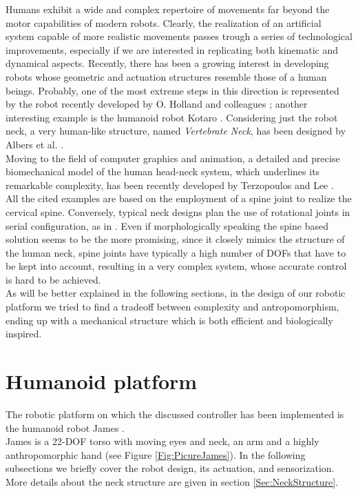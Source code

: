 \documentclass[conference]{IEEEtran}
\numberwithin{equation}{section}
\begin{document}
Humans exhibit a wide and complex repertoire of movements far beyond the motor capabilities of modern robots. Clearly, the
realization of an artificial system capable of more realistic movements passes trough a series of technological improvements,
especially if we are interested in replicating both kinematic and dynamical aspects. Recently, there has been a growing interest in developing robots whose geometric and actuation structures resemble those of a human beings. Probably, one of the most extreme steps in this direction is represented by the robot recently developed by O. Holland and colleagues \cite{Cronos}; another interesting example is the humanoid robot Kotaro \cite{Kotaro}. Considering just the robot neck, a very human-like structure, named \emph{Vertebrate Neck}, has been designed by Albers et al. \cite{Albers03humanoid}.\\Moving to the field of computer graphics and animation, a detailed and precise biomechanical model of the human head-neck system, which underlines its remarkable complexity, has been recently developed by Terzopoulos and Lee \cite{Terzopoulos06}.\\All the cited examples are based on the employment of a spine joint to realize the cervical spine. Conversely, typical neck designs plan the use of rotational joints in serial configuration, as in \cite{Kim04head,Billard05robota}. Even if morphologically speaking the spine based solution seems to be the more promising, since it closely mimics the structure of the human neck, spine joints have typically a high number of DOFs that have to be kept into account, resulting in a very complex system, whose accurate control is hard to be achieved.\\As will be better explained in the following sections, in the design of our robotic platform we tried to find a tradeoff between complexity and antropomorphism, ending up with a mechanical structure which is both efficient and biologically inspired.


\section{Humanoid platform} \label{Sec:Platform}

The robotic platform on which the discussed controller has been implemented is the humanoid robot James \cite{James06}.\\James is a 22-DOF torso with moving eyes and neck, an arm and a highly anthropomorphic hand (see Figure \ref{Fig:PicureJames}). In the following subsections we briefly cover the robot design, its actuation, and sensorization. More details about the neck structure are given in section \ref{Sec:NeckStructure}.
\end{document}
